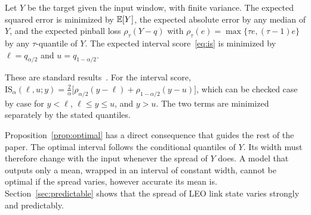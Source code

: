 \begin{proposition}
\label{prop:optimal}
Let $Y$ be the target given the input window, with finite variance. The expected squared error is minimized by $\mathbb{E}[Y]$, the expected absolute error by any median of $Y$, and the expected pinball loss $\rho_\tau(Y-q)$ with $\rho_\tau(e)=\max\{\tau e,(\tau-1)e\}$ by any $\tau$-quantile of $Y$. The expected interval score~\eqref{eq:is} is minimized by $\ell=q_{\alpha/2}$ and $u=q_{1-\alpha/2}$.
\end{proposition}
\begin{IEEEproof}
These are standard results~\cite{gneiting2011making,koenker1978regression}. For the interval score, $\mathrm{IS}_\alpha(\ell,u;y)=\frac{2}{\alpha}\big[\rho_{\alpha/2}(y-\ell)+\rho_{1-\alpha/2}(y-u)\big]$, which can be checked case by case for $y<\ell$, $\ell\le y\le u$, and $y>u$. The two terms are minimized separately by the stated quantiles.
\end{IEEEproof}

Proposition~\ref{prop:optimal} has a direct consequence that guides the rest of the paper. The optimal interval follows the conditional quantiles of $Y$. Its width must therefore change with the input whenever the spread of $Y$ does. A model that outputs only a mean, wrapped in an interval of constant width, cannot be optimal if the spread varies, however accurate its mean is. Section~\ref{sec:predictable} shows that the spread of LEO link state varies strongly and predictably.

